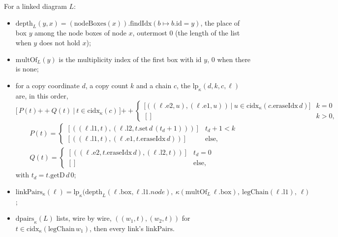 \begin{definition}\label{def:lean-sym-lp}
For a linked diagram $L$:
\begin{itemize}
\item $\mathrm{depth}_L(y,x)=(\mathrm{nodeBoxes}(x)).\mathrm{findIdx}(b\mapsto b.\mathrm{id}=y)$, the place of box $y$ among the node boxes of node $x$, outermost $0$ (the length of the list when $y$ does not hold $x$);
\item $\mathrm{multOf}_L(y)$ is the multiplicity index of the first box with id $y$, $0$ when there is none;
\item for a copy coordinate $d$, a copy count $k$ and a chain $c$, the  $\mathrm{lp}_\kappa(d,k,c,\ell)$ are, in this order,
\[
\bigl[\,P(t)\mathbin{+\!\!+}Q(t)\ \big|\ t\in\mathrm{cidx}_\kappa(c)\,\bigr]\mathbin{+\!\!+}\begin{cases}\bigl[((\ell.\mathrm{e2},u),(\ell.\mathrm{e1},u))\ \big|\ u\in\mathrm{cidx}_\kappa(c.\mathrm{eraseIdx}\,d)\bigr]&k=0\\ []&k>0,\end{cases}
\]
\begin{gather*}
P(t)=\begin{cases}[((\ell.\mathrm{l1},t),(\ell.\mathrm{l2},t.\mathrm{set}\,d\,(t_d+1)))]& t_d+1<k\\ [((\ell.\mathrm{l1},t),(\ell.\mathrm{e1},t.\mathrm{eraseIdx}\,d))]&\text{else,}\end{cases}\\
Q(t)=\begin{cases}[((\ell.\mathrm{e2},t.\mathrm{eraseIdx}\,d),(\ell.\mathrm{l2},t))]&t_d=0\\ []&\text{else,}\end{cases}
\end{gather*}
with $t_d=t.\mathrm{getD}\,d\,0$;
\item $\mathrm{linkPairs}_\kappa(\ell)=\mathrm{lp}_\kappa\bigl(\mathrm{depth}_L(\ell.\mathrm{box},\ell.\mathrm{l1}.\mathit{node}),\ \kappa(\mathrm{multOf}_L\,\ell.\mathrm{box}),\ \mathrm{legChain}(\ell.\mathrm{l1}),\ \ell\bigr)$;
\item $\mathrm{dpairs}_\kappa(L)$ lists, wire by wire, $((w_1,t),(w_2,t))$ for $t\in\mathrm{cidx}_\kappa(\mathrm{legChain}\,w_1)$, then every link's $\mathrm{linkPairs}$.
\end{itemize}
\end{definition}

